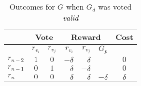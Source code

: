 \begin{table}[hbt]
    \caption{Outcomes for $G$ when $G_d$ was voted \emph{valid}}
    \begin{tabular}{lccrrrc}
    \toprule
        \hspace   & \multicolumn{2}{c}{Vote} & \multicolumn{3}{c}{Reward} & Cost                     \\
    \midrule
        \hspace   & $r_{v_i}$  & $r_{v_j}$   & $r_{v_i}$ & $r_{v_j}$ & $G_p$     &                   \\
    \addlinespace[0.5em]
        $r_{n-2}$ & $1$        & $0$         & $-\delta$ & $\delta$  &           & $0$               \\
        $r_{n-1}$ & $0$        & $1$         & $\delta$  & $-\delta$ &           & $0$               \\
        $r_{n}$   & $0$        & $0$         & $\delta$  & $\delta$  & $-\delta$ & $\delta$          \\
    \bottomrule
    \end{tabular}
\end{table}

